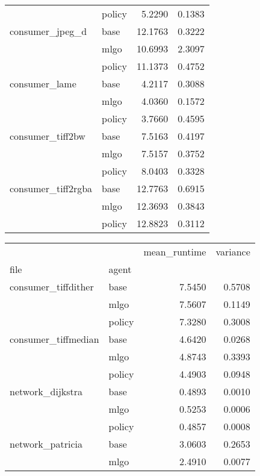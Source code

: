 \begin{table*}
\begin{tabular}[t]{llrr}
                & policy &        5.2290 &    0.1383 \\
consumer\_jpeg\_d & base &       12.1763 &    0.3222 \\
                & mlgo &       10.6993 &    2.3097 \\
                & policy &       11.1373 &    0.4752 \\
consumer\_lame & base &        4.2117 &    0.3088 \\
                & mlgo &        4.0360 &    0.1572 \\
                & policy &        3.7660 &    0.4595 \\
consumer\_tiff2bw & base &        7.5163 &    0.4197 \\
                & mlgo &        7.5157 &    0.3752 \\
                & policy &        8.0403 &    0.3328 \\
consumer\_tiff2rgba & base &       12.7763 &    0.6915 \\
                & mlgo &       12.3693 &    0.3843 \\
                & policy &       12.8823 &    0.3112 \\
\end{tabular}
\;
\;
\begin{tabular}[t]{llrr}
\toprule
                &        &  mean\_runtime &  variance \\
file & agent &               &           \\
\midrule
consumer\_tiffdither & base &        7.5450 &    0.5708 \\
                & mlgo &        7.5607 &    0.1149 \\
                & policy &        7.3280 &    0.3008 \\
consumer\_tiffmedian & base &        4.6420 &    0.0268 \\
                & mlgo &        4.8743 &    0.3393 \\
                & policy &        4.4903 &    0.0948 \\
network\_dijkstra & base &        0.4893 &    0.0010 \\
                & mlgo &        0.5253 &    0.0006 \\
                & policy &        0.4857 &    0.0008 \\
network\_patricia & base &        3.0603 &    0.2653 \\
                & mlgo &        2.4910 &    0.0077 \\

\end{tabular}
\end{table*}
